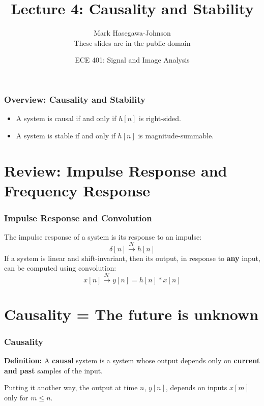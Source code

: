 \documentclass{beamer}
\title{Lecture 4: Causality and Stability}
\author{Mark Hasegawa-Johnson\\These slides are in the public domain}
\date{ECE 401: Signal and Image Analysis}
\begin{document}
\begin{frame}
  \maketitle
\end{frame}

\begin{frame}
  \frametitle{Overview: Causality and Stability}

  \begin{itemize}
  \item A system is causal if and only if $h[n]$ is right-sided.
  \item A system is stable if and only if $h[n]$ is
    magnitude-summable.
  \end{itemize}
\end{frame}

\begin{frame}
  \tableofcontents
\end{frame}

\section[Review]{Review: Impulse Response and Frequency Response}
\setcounter{subsection}{1}

\begin{frame}
  \frametitle{Impulse Response and Convolution}

  The impulse response of a system is its response to an impulse:
  \begin{displaymath}
    \delta[n] \stackrel{\mathcal H}{\longrightarrow} h[n]
  \end{displaymath}
  If a system is linear and shift-invariant, then its output, in
  response to {\bf any} input, can be computed  using convolution:
  \begin{displaymath}
    x[n] \stackrel{\mathcal H}{\longrightarrow} y[n]=h[n]\ast x[n]
  \end{displaymath}
\end{frame}

\section[Causality]{Causality = The future is unknown}
\setcounter{subsection}{1}

\begin{frame}
  \frametitle{Causality}

  {\bf Definition:} A {\bf causal} system is a system whose output
  depends only on {\bf current and past} samples of the input.

  Putting it another way, the output at time $n$, $y[n]$, depends on
  inputs $x[m]$ only for $m\le n$.
\end{frame}
  
\end{document}
